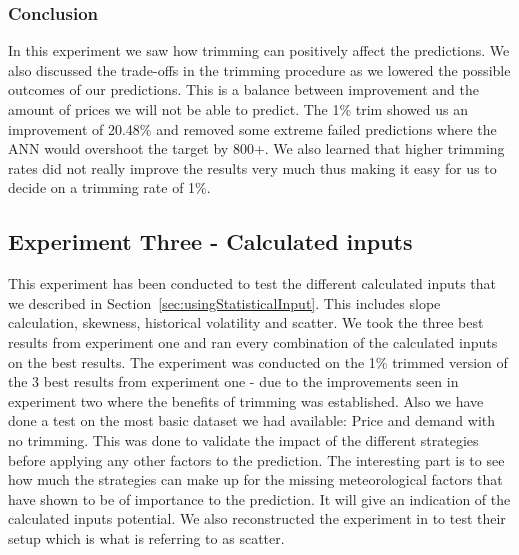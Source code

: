 \begin{table}[H]
\centering  %
\caption{Trims} %
\label{table:Top10Trimming} %
\end{table}

\subsubsection{Conclusion}
In this experiment we saw how trimming can positively affect the predictions. We also discussed the trade-offs in the trimming procedure as we lowered the possible outcomes of our predictions. This is a balance between improvement and the amount of prices we will not be able to predict. The 1\% trim showed us an improvement of 20.48\% and removed some extreme failed predictions where the ANN would overshoot the target by 800+. We also learned that higher trimming rates did not really improve the results very much thus making it easy for us to decide on a trimming rate of 1\%.

\newpage
\subsection{Experiment Three - Calculated inputs}
\label{sec:priceExperimentThree}
This experiment has been conducted to test the different calculated inputs that we described in Section~\ref{sec:usingStatisticalInput}. This includes slope calculation, skewness, historical volatility and scatter. We took the three best results from experiment one and ran every combination of the calculated inputs on the best results. The experiment was conducted on the 1\% trimmed version of the 3 best results from experiment one - due to the improvements seen in experiment two where the benefits of trimming was established. Also we have done a test on the most basic dataset we had available: Price and demand with no trimming. This was done to validate the impact of the different strategies before applying any other factors to the prediction. The interesting part is to see how much the strategies can make up for the missing meteorological factors that have shown to be of importance to the prediction. It will give an indication of the calculated inputs potential. We also reconstructed the experiment in \cite{singhal2011electricity} to test their setup which is what is referring to as scatter.

